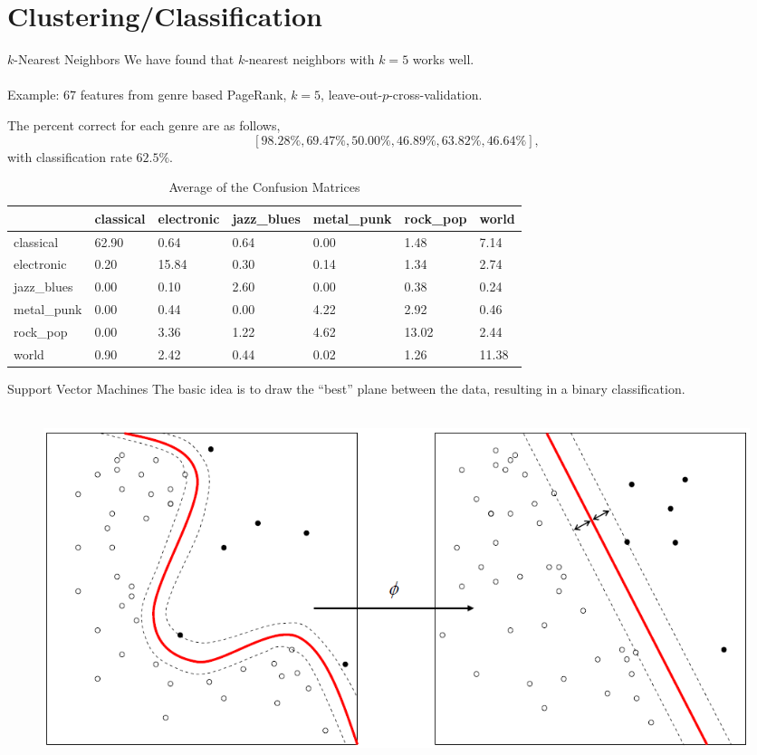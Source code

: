 \documentclass[xcolor=dvipsnames,t]{beamer} %
\begin{document}
\section{Clustering/Classification}
\begin{frame}[shrink=20]{$k$-Nearest Neighbors}
   We have found that $k$-nearest neighbors with $k=5$ works well.\\

   ~\\
   Example: $67$ features from genre based PageRank, $k=5$, leave-out-$p$-cross-validation.

   The percent correct for each genre are as follows,
      \[ [98.28\%, 69.47\%,50.00\%,46.89\%,63.82\%,46.64\%], \]
   with classification rate $62.5\%$.


   \begin{table}[h!]
      \centering
 \begin{tabular}{ l||l | l | l | l | l | l | }
 & classical & electronic & jazz\_blues & metal\_punk & rock\_pop & world\\\hline
classical & 62.90 &0.64 &0.64 &0.00 &1.48 &7.14 \\ \hline 
electronic & 0.20 &15.84 &0.30 &0.14 &1.34 &2.74 \\ \hline 
jazz\_blues & 0.00 &0.10 &2.60 &0.00 &0.38 &0.24 \\ \hline 
metal\_punk & 0.00 &0.44 &0.00 &4.22 &2.92 &0.46 \\ \hline 
rock\_pop & 0.00 &3.36 &1.22 &4.62 &13.02 &2.44 \\ \hline 
world & 0.90 &2.42 &0.44 &0.02 &1.26 &11.38 \\ \hline 
\end{tabular}
      \caption{Average of the Confusion Matrices}
   \end{table}

\end{frame}

\begin{frame}{Support Vector Machines}
   The basic idea is to draw the ``best'' plane between the data, resulting in a binary classification.\\

~\\[3em] %
\begin{figure}[b]
   \centering
   \includegraphics[width=\textwidth]{figures/Kernel_Machine_public.png}
\end{figure}
\end{frame}
\end{document}
